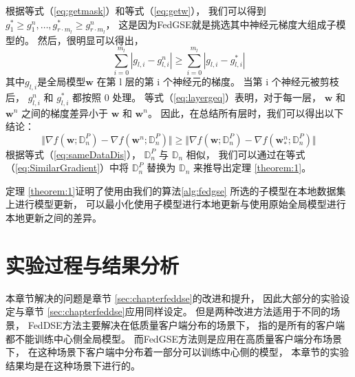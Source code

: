 根据等式（\ref{eq:getmask}）和等式（\ref{eq:getw}），
我们可以得到 
$ g_1^* \geq g_1^n , \dots , g_{r \cdot m_l}^* \geq g_{r \cdot m_l}^n $，
这是因为FedGSE就是挑选其中神经元梯度大组成子模型的。
然后，很明显可以得出，
\begin{equation}
    \label{eq:layergeq}
    \sum_{i=0}^{m_l}|g_{l,i}-g_{l,i}^n| \geq 
    \sum_{i=0}^{m_l}|g_{l,i}-g_{l,i}^*|
\end{equation}
其中$g_{l,i}$是全局模型$\mathbf{w}$ 在第 l 层的第 i 个神经元的梯度。
当第 i 个神经元被剪枝后，
$g_{l,i}^n$ 和 $g_{l,i}^*$ 都按照 0 处理。
等式（\ref{eq:layergeq}）表明，对于每一层，
$\mathbf{w}$ 和 $\mathbf{w}^n$
之间的梯度差异小于
$\mathbf{w}$ 和 $\mathbf{w}^n$。
因此，在总结所有层时，我们可以得出以下结论：
\begin{equation}\label{eq:SimilarGradient}
    \Vert \nabla{f( \mathbf{w}; \mathbb{D}^P_n) } - \nabla{ f( \mathbf{w}^n; \mathbb{D}^P_n ) } \Vert \geq 
  \Vert \nabla{f( \mathbf{w}; \mathbb{D}^P_n) } - \nabla{ f( \mathbf{w}^n_*; \mathbb{D}^P_n ) } \Vert
\end{equation}
根据等式（\ref{eq:sameDataDis}），
$\mathbb{D}^P_n$ 与 $\mathbb{D}_n$ 相似，
我们可以通过在等式（\ref{eq:SimilarGradient}）中将
$\mathbb{D}^P_n$ 替换为 $\mathbb{D}_n$
来推导出定理 \ref{theorem:1}。

定理 \ref{theorem:1}证明了使用由我们的算法\ref{alg:fedgse}
所选的子模型在本地数据集上进行模型更新，
可以最小化使用子模型进行本地更新与使用原始全局模型进行本地更新之间的差异。

\section{实验过程与结果分析}
本章节解决的问题是章节 \ref{sec:chapterfeddse}的改进和提升，
因此大部分的实验设定与章节 \ref{sec:chapterfeddse}应用同样设定。
但是两种改进方法适用于不同的场景，
FedDSE方法主要解决在低质量客户端分布的场景下，
指的是所有的客户端都不能训练中心侧全局模型。
而FedGSE方法则是应用在高质量客户端分布场景下，
在这种场景下客户端中分布着一部分可以训练中心侧的模型，
本章节的实验结果均是在这种场景下进行的。

